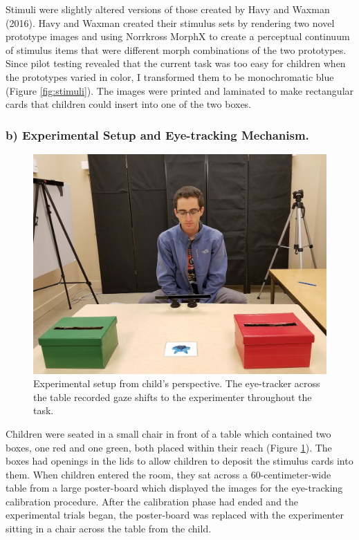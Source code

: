 \documentclass[,man,floatsintext]{apa6}
\begin{document}
Stimuli were slightly altered versions of those created by Havy and Waxman (2016). Havy and Waxman created their stimulus sets by rendering two novel prototype images and using Norrkross MorphX to create a perceptual continuum of stimulus items that were different morph combinations of the two prototypes. Since pilot testing revealed that the current task was too easy for children when the prototypes varied in color, I transformed them to be monochromatic blue (Figure \ref{fig:stimuli}). The images were printed and laminated to make rectangular cards that children could insert into one of the two boxes.

\hypertarget{b-experimental-setup-and-eye-tracking-mechanism.}{%
\subsubsection{b) Experimental Setup and Eye-tracking Mechanism.}\label{b-experimental-setup-and-eye-tracking-mechanism.}}

\begin{figure}
\centering
\includegraphics{../images/setup.jpg}
\caption{\label{fig:setup}Experimental setup from child's perspective. The eye-tracker across the table recorded gaze shifts to the experimenter throughout the task.}
\end{figure}

Children were seated in a small chair in front of a table which contained two boxes, one red and one green, both placed within their reach (Figure \ref{fig:setup}). The boxes had openings in the lids to allow children to deposit the stimulus cards into them. When children entered the room, they sat across a 60-centimeter-wide table from a large poster-board which displayed the images for the eye-tracking calibration procedure. After the calibration phase had ended and the experimental trials began, the poster-board was replaced with the experimenter sitting in a chair across the table from the child.
\end{document}
